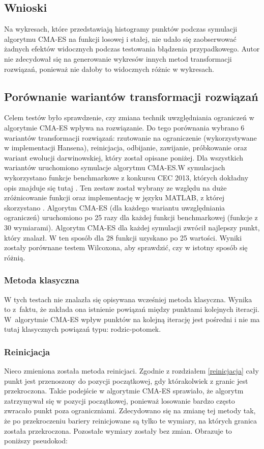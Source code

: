 \documentclass{mini}
\begin{document}
\subsection{Wnioski}
Na wykresach, które przedstawiają histogramy punktów podczas symulacji algorytmu CMA-ES na funkcji losowej i stałej, nie udało się zaobserwować żadnych efektów widocznych podczas testowania błądzenia przypadkowego. Autor nie zdecydował się na generowanie wykresów innych metod transformacji rozwiązań, ponieważ nie dałoby to widocznych różnic w wykresach.

\subsection{Porównanie wariantów transformacji rozwiązań}
Celem testów było sprawdzenie, czy zmiana technik uwzględniania ograniczeń w algorytmie CMA-ES wpływa na rozwiązanie. Do tego porównania wybrano 6 wariantów transformacji rozwiązań: rzutowanie na ograniczenie (wykorzystywane w implementacji Hansena), reinicjacja, odbijanie, zawijanie, próbkowanie oraz wariant ewolucji darwinowskiej, który został opisane poniżej. Dla wszystkich wariantów uruchomiono symulacje algorytmu CMA-ES.W symulacjach wykorzystano funkcje benchmarkowe z konkursu CEC 2013, których dokładny opis znajduje się tutaj \cite{cec}. Ten zestaw został wybrany ze względu na duże zróżnicowanie funkcji oraz implementację w języku MATLAB, z której skorzystano \cite{cec_code}. Algorytm CMA-ES (dla każdego wariantu uwzględniania ograniczeń) uruchomiono po 25 razy dla każdej funkcji benchmarkowej (funkcje z 30 wymiarami). Algorytm CMA-ES dla każdej symulacji zwrócił najlepszy punkt, który znalazł. W ten sposób dla 28 funkcji uzyskano po 25 wartości. Wyniki zostały porównane testem Wilcoxona, aby sprawdzić, czy w istotny sposób się różnią.

\subsubsection*{Metoda klasyczna}
W tych testach nie znalazła się opisywana wcześniej metoda klasyczna. Wynika to z~faktu, że zakłada ona istnienie powiązań między punktami kolejnych iteracji. W~algorytmie CMA-ES wpływ punktów na kolejną iterację jest pośredni i nie ma tutaj klasycznych powiązań typu: rodzic-potomek.

\subsubsection*{Reinicjacja}
Nieco zmieniona została metoda reinicjaci. Zgodnie z rozdziałem \ref{reinicjacja} cały punkt jest przenoszony do pozycji początkowej, gdy którakolwiek z granic jest przekroczona. Takie podejście w algorytmie CMA-ES sprawiało, że algorytm zatrzymywał się w pozycji początkowej, ponieważ losowanie bardzo często zwracało punkt poza ograniczniami. Zdecydowano się na zmianę tej metody tak, że po przekroczeniu bariery reinicjowane są tylko te wymiary, na których granica została przekroczona. Pozostałe wymiary zostały bez zmian. Obrazuje to poniższy pseudokod:
\end{document}
